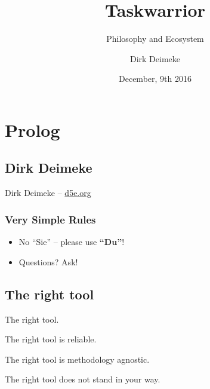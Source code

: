 \documentclass[t,handout,aspectratio=169]{beamer}
\title{Taskwarrior}
\subtitle{Philosophy and Ecosystem}
\date{December, 9th 2016}
\author{Dirk Deimeke}
\institute{Taskwarrior Academy @ TNG Technology Consulting GmbH}
\begin{document}
\begin{frame}
    \titlepage
\end{frame}

\section{Prolog}

\subsection{Dirk Deimeke}

\begin{frame}[standout]
    Dirk Deimeke -- \href{https://d5e.org/}{d5e.org}
\end{frame}

\begin{frame}[fragile]\frametitle{Very Simple Rules}
    \vfill \pause
    \begin{itemize}
        \item No ``Sie'' -- please use \textbf{``Du''}! \pause
        \item Questions? Ask!
    \end{itemize}
\end{frame}

\subsection{The right tool}

\begin{frame}[standout]
    The right tool.
\end{frame}

\begin{frame}[standout]
    The right tool is reliable.
\end{frame}

\begin{frame}[standout]
    The right tool is methodology agnostic.
\end{frame}

\begin{frame}[standout]
    The right tool does not stand in your way.
\end{frame}
\end{document}
